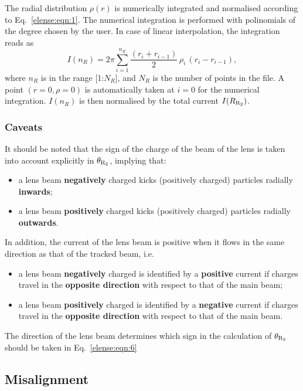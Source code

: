 \documentclass[english]{article}
\begin{document}
The radial distribution $\rho(r)$ is numerically integrated and normalised
according to Eq.~\ref{elense:eqn:1}.
The numerical integration is performed with polinomials of the degree chosen by the user.
In case of linear interpolation, the integration reads as
\begin{equation}
  I(n_R) = 2\pi \sum_{i=1}^{n_R} \frac{(r_i+r_{i-1})}{2} \, \rho_i \, (r_i-r_{i-1}),
\label{elense:eqn:5}
\end{equation}
where $n_R$ is in the range [1:$N_R$], and $N_R$ is the number of points in the file.
A point $(r=0,\rho=0)$ is automatically taken at $i=0$ for the numerical
integration. $I(n_R)$ is then normalised by the total current $I(R_{\rm R_2})$.

\subsubsection{Caveats}
It should be noted that the sign of the charge of the beam of the lens is taken into account explicitly in $\theta_{\rm R_2}$, implying that:
\begin{itemize}
\item a lens beam \textbf{negatively} charged kicks (positively charged) particles radially \textbf{inwards};
\item a lens beam \textbf{positively} charged kicks (positively charged) particles radially \textbf{outwards}.
\end{itemize}

In addition, the current of the lens beam is positive when it flows in the same direction as that of the tracked beam, i.e.
\begin{itemize}
\item a lens beam \textbf{negatively} charged is identified by a \textbf{positive} current if charges travel in the \textbf{opposite direction} with respect to that of the main beam;
\item a lens beam \textbf{positively} charged is identified by a \textbf{negative} current if charges travel in the \textbf{opposite direction} with respect to that of the main beam.
\end{itemize}

The direction of the lens beam determines which sign in the calculation of $\theta_{\rm R_2}$ should be taken in Eq.~\ref{elense:eqn:6}

\subsection{Misalignment}
\end{document}
